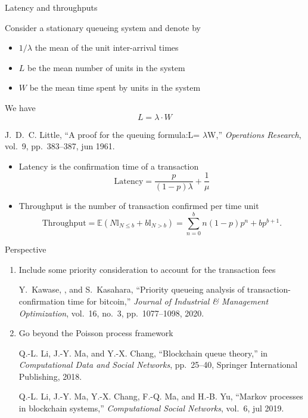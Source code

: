 \documentclass{beamer}
\begin{document}
\begin{frame}{Latency and throughputs}
\scriptsize
\begin{tcolorbox}[enhanced,drop shadow, title=Little's law]
Consider a stationary queueing system and denote by 
\begin{itemize}
  \item $1/\lambda$ the mean of the unit inter-arrival times
  \item $L$ be the mean number of units in the system
  \item $W$ be the mean time spent by units in the system
\end{itemize}
We have
$$
L = \lambda \cdot W
$$
\end{tcolorbox}
\tiny
\begin{thebibliography}{1}

J.~D.~C. Little, ``A proof for the queuing formula:{L}= $\lambda${W},'' {\em
  Operations Research}, vol.~9, pp.~383--387, jun 1961.

\end{thebibliography}
\scriptsize
\begin{itemize}
  \item Latency is the confirmation time of a transaction 
    $$
    \text{Latency} = \frac{p}{(1-p)\lambda} + \frac{1}{\mu}
    $$
  \item Throughput is the number of transaction confirmed per time unit
  $$
    \text{Throughput} = \mathbb{E}(N\mathbb{I}_{N\leq b}+b\mathbb{I}_{N> b}) = \sum_{n = 0}^bn(1-p)p^n + bp^{b+1}.
  $$
\end{itemize}
\end{frame}
\begin{frame}{Perspective}
\begin{enumerate}
  \item  Include some priority consideration to account for the transaction fees 
  \tiny 
  \begin{thebibliography}{1}

Y.~Kawase, , and S.~Kasahara, ``Priority queueing analysis of
  transaction-confirmation time for bitcoin,'' {\em Journal of Industrial {\&}
  Management Optimization}, vol.~16, no.~3, pp.~1077--1098, 2020.

\end{thebibliography}

  \item \normalsize Go beyond the Poisson process framework
  \tiny
  \begin{thebibliography}{1}

Q.-L. Li, J.-Y. Ma, and Y.-X. Chang, ``Blockchain queue theory,'' in {\em
  Computational Data and Social Networks}, pp.~25--40, Springer International
  Publishing, 2018.

Q.-L. Li, J.-Y. Ma, Y.-X. Chang, F.-Q. Ma, and H.-B. Yu, ``Markov processes in
  blockchain systems,'' {\em Computational Social Networks}, vol.~6, jul 2019.

\end{thebibliography}
\end{enumerate}

\end{frame}
\end{document}
